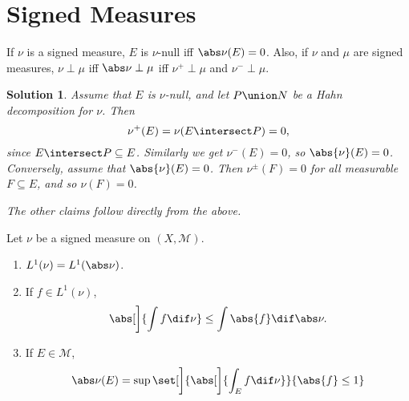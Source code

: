 \documentclass[article, a4paper, 11pt, oneside]{memoir}
\numberwithin{equation}{chapter}
\newcommand{\calM}{\mathcal{M}}
\theoremstyle{nonumberplain}
\newtheorem{solution}{Solution}
\begin{document}
\section{Signed Measures}

\begin{exerciseframed*}[2]
	If $\nu$ is a signed measure, $E$ is $\nu$-null iff $\abs\nu(E) = 0$. Also, if $\nu$ and $\mu$ are signed measures, $\nu \perp \mu$ iff $\abs\nu \perp \mu$ iff $\nu^+ \perp \mu$ and $\nu^- \perp \mu$.
\end{exerciseframed*}

\begin{solution}
	Assume that $E$ is $\nu$-null, and let $P \union N$ be a Hahn decomposition for $\nu$. Then
	\begin{equation*}
		\nu^+(E) = \nu(E \intersect P) = 0,
	\end{equation*}
	since $E \intersect P \subseteq E$. Similarly we get $\nu^-(E) = 0$, so $\abs{\nu}(E) = 0$. Conversely, assume that $\abs{\nu}(E) = 0$. Then $\nu^\pm(F) = 0$ for all measurable $F \subseteq E$, and so $\nu(F) = 0$.

	The other claims follow directly from the above.
\end{solution}


\begin{exerciseframed*}[3]
	Let $\nu$ be a signed measure on $(X,\calM)$.
	\begin{enumerate}
		\item $L^1(\nu) = L^1(\abs\nu)$.
		\item If $f \in L^1(\nu)$,
		\begin{equation*}
			\abs[\bigg]{ \int f \dif\nu }
				\leq \int \abs{f} \dif\abs\nu.
		\end{equation*}
		
		\item If $E \in \calM$,
		\begin{equation*}
			\abs\nu(E)
				= \sup\set[\bigg]{ \abs[\bigg]{\int_E f \dif\nu} }{ \abs{f} \leq 1 }
		\end{equation*}
	\end{enumerate}
\end{exerciseframed*}
\end{document}
